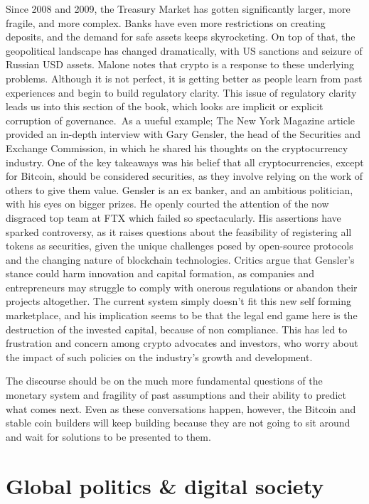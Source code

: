 Since 2008 and 2009, the Treasury Market has gotten significantly larger, more fragile, and more complex. Banks have even more restrictions on creating deposits, and the demand for safe assets keeps skyrocketing. On top of that, the geopolitical landscape has changed dramatically, with US sanctions and seizure of Russian USD assets. Malone notes that crypto is a response to these underlying problems. Although it is not perfect, it is getting better as people learn from past experiences and begin to build regulatory clarity. This issue of regulatory clarity leads us into this section of the book, which looks are implicit or explicit corruption of governance.\
As a uueful example; The New York Magazine article provided an in-depth interview with Gary Gensler, the head of the Securities and Exchange Commission, in which he shared his thoughts on the cryptocurrency industry. One of the key takeaways was his belief that all cryptocurrencies, except for Bitcoin, should be considered securities, as they involve relying on the work of others to give them value. Gensler is an ex banker, and an ambitious politician, with his eyes on bigger prizes. He openly courted the attention of the now disgraced top team at FTX which failed so spectacularly. His assertions have sparked controversy, as it raises questions about the feasibility of registering all tokens as securities, given the unique challenges posed by open-source protocols and the changing nature of blockchain technologies. Critics argue that Gensler's stance could harm innovation and capital formation, as companies and entrepreneurs may struggle to comply with onerous regulations or abandon their projects altogether. The current system simply doesn't fit this new self forming marketplace, and his implication seems to be that the legal end game here is the destruction of the invested capital, because of non compliance. This has led to frustration and concern among crypto advocates and investors, who worry about the impact of such policies on the industry's growth and development.\par
The discourse should be on the much more fundamental questions of the monetary system and fragility of past assumptions and their ability to predict what comes next. Even as these conversations happen, however, the Bitcoin and stable coin builders will keep building because they are not going to sit around and wait for solutions to be presented to them.
\section{Global politics \& digital society}
